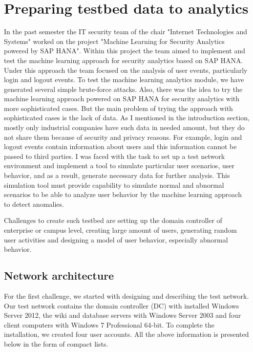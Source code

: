 \section{Preparing testbed data to analytics}
In the past semester the IT security team of the chair "Internet Technologies and Systems" worked on the project "Machine Learning for Security Analytics powered by SAP HANA". Within this project the team aimed to implement and test the machine learning approach for security analytics based on SAP HANA. Under this approach the team focused on the analysis of user events, particularly login and logout events. To test the machine learning analytics module, we have generated several simple brute-force attacks. Also, there was the idea to try the machine learning approach powered on SAP HANA for security analytics with more sophisticated cases. But the main problem of trying the approach with sophisticated cases is the lack of data. As I mentioned in the introduction section, mostly only industrial companies have such data in needed amount, but they do not share them because of security and privacy reasons. For example, login and logout events contain information about users and this information cannot be passed to third parties. I was faced with the task to set up a test network environment and implement a tool to simulate particular user scenarios, user behavior, and as a result, generate necessary data for further analysis. This simulation tool must provide capability to simulate normal and abnormal scenarios to be able to analyze user behavior by the machine learning approach to detect anomalies.  

Challenges to create such testbed are setting up the domain controller of enterprise or campus level, creating large amount of users, generating random user activities and designing a model of user behavior, especially abnormal behavior.
  
\subsection{Network architecture}
For the first challenge, we started with designing and describing the test network. Our test network contains the domain controller (DC) with installed Windows Server 2012, the wiki and database servers with Windows Server 2003 and four client computers with Windows 7 Professional 64-bit. To complete the installation, we created four user accounts. All the above information is presented below in the form of compact lists.

